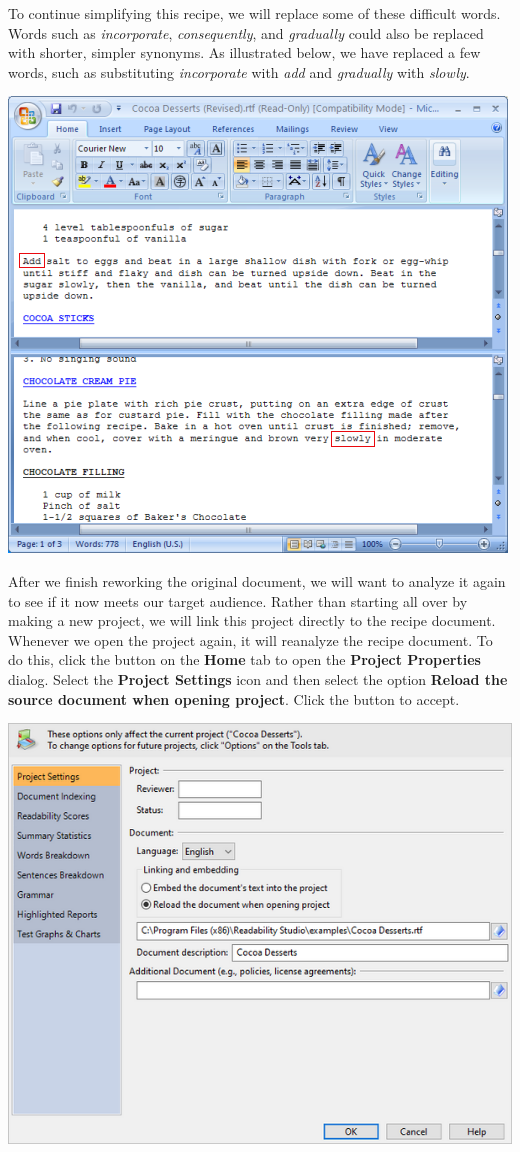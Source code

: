 \documentclass[
]{book}
\theoremstyle{definition}
\theoremstyle{definition}
\theoremstyle{definition}
\theoremstyle{definition}
\theoremstyle{remark}
\begin{document}
To continue simplifying this recipe, we will replace some of these difficult words. Words such as \emph{incorporate}, \emph{consequently}, and \emph{gradually} could also be replaced with shorter, simpler synonyms. As illustrated below, we have replaced a few words, such as substituting \emph{incorporate} with \emph{add} and \emph{gradually} with \emph{slowly}.

\begin{center}\includegraphics[width=0.75\linewidth,]{Images/NonGenerated/improvedwords} \end{center}

After we finish reworking the original document, we will want to analyze it again to see if it now meets our target audience. Rather than starting all over by making a new project, we will link this project directly to the recipe document. Whenever we open the project again, it will reanalyze the recipe document. To do this, click the  button on the \textbf{Home} tab to open the \textbf{Project Properties} dialog. Select the \textbf{Project Settings} icon and then select the option \textbf{Reload the source document when opening project}. Click the  button to accept.

\includegraphics{Images/linktofile.png}
\end{document}
